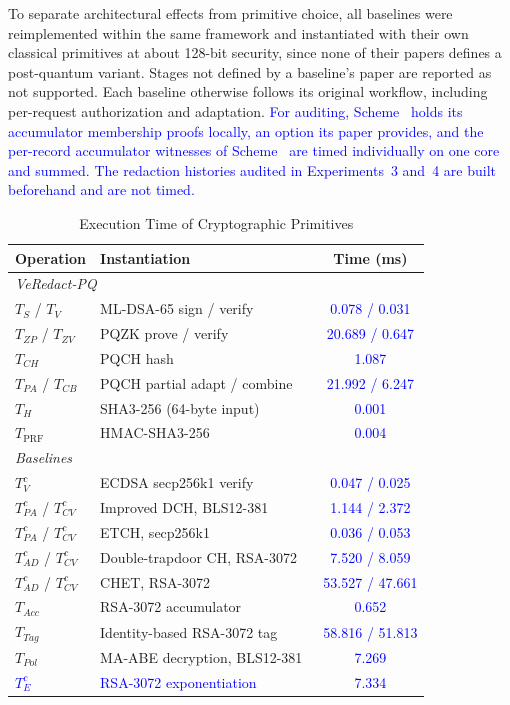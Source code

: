 \documentclass[lettersize,journal]{IEEEtran}
\newcommand{\chg}[1]{\textcolor{blue}{#1}}
\begin{document}
    To separate architectural effects from primitive choice, all baselines were reimplemented within the same framework and
    instantiated with their own classical primitives at about 128-bit
    security, since none of their papers defines a post-quantum variant.
    Stages not
    defined by a baseline's paper are reported as not supported. Each baseline otherwise follows its original
    workflow, including per-request authorization and adaptation.
    \chg{For auditing, Scheme~\cite{ref1} holds its accumulator membership
    proofs locally, an option its paper provides, and the per-record
    accumulator witnesses of Scheme~\cite{ref13} are timed individually on one
    core and summed. The redaction histories audited in Experiments~3 and~4
    are built beforehand and are not timed.}

    \begin{table}[t]
    \centering
    \caption{Execution Time of Cryptographic Primitives}
    \label{tab:primitives}
    \scriptsize
    \renewcommand{\arraystretch}{1.08}
    \setlength{\tabcolsep}{4pt}
    \begin{tabular}{llc}
    \hline
    \textbf{Operation} & \textbf{Instantiation} & \textbf{Time (ms)} \\
    \hline
    \multicolumn{3}{l}{\textit{VeRedact-PQ}} \\
    $T_S$ / $T_V$ & ML-DSA-65 sign / verify & \chg{0.078 / 0.031} \\
    $T_{ZP}$ / $T_{ZV}$ & PQZK prove / verify & \chg{20.689 / 0.647} \\
    $T_{CH}$ & PQCH hash & \chg{1.087} \\
    $T_{PA}$ / $T_{CB}$ & PQCH partial adapt / combine & \chg{21.992 / 6.247} \\
    $T_H$ & SHA3-256 (64-byte input) & \chg{0.001} \\
    $T_{\mathrm{PRF}}$ & HMAC-SHA3-256 & \chg{0.004} \\
    \hline
    \multicolumn{3}{l}{\textit{Baselines}} \\
    $T_V^{c}$ & ECDSA secp256k1 verify~\cite{ref1,ref27} & \chg{0.047 / 0.025} \\
    $T_{PA}^{c}$ / $T_{CV}^{c}$ & Improved DCH, BLS12-381~\cite{ref1} & \chg{1.144 / 2.372} \\
    $T_{PA}^{c}$ / $T_{CV}^{c}$ & ETCH, secp256k1~\cite{ref27} & \chg{0.036 / 0.053} \\
    $T_{AD}^{c}$ / $T_{CV}^{c}$ & Double-trapdoor CH, RSA-3072~\cite{ref13} & \chg{7.520 / 8.059} \\
    $T_{AD}^{c}$ / $T_{CV}^{c}$ & CHET, RSA-3072~\cite{ref34} & \chg{53.527 / 47.661} \\
    $T_{Acc}$ & RSA-3072 accumulator~\cite{ref1,ref13} & \chg{0.652} \\
    $T_{Tag}$ & Identity-based RSA-3072 tag~\cite{ref13} & \chg{58.816 / 51.813} \\
    $T_{Pol}$ & MA-ABE decryption, BLS12-381~\cite{ref34} & \chg{7.269} \\
    \chg{$T_E^{c}$} & \chg{RSA-3072 exponentiation~\cite{ref13}} & \chg{7.334} \\
    \hline
    \end{tabular}
    \end{table}
\end{document}
